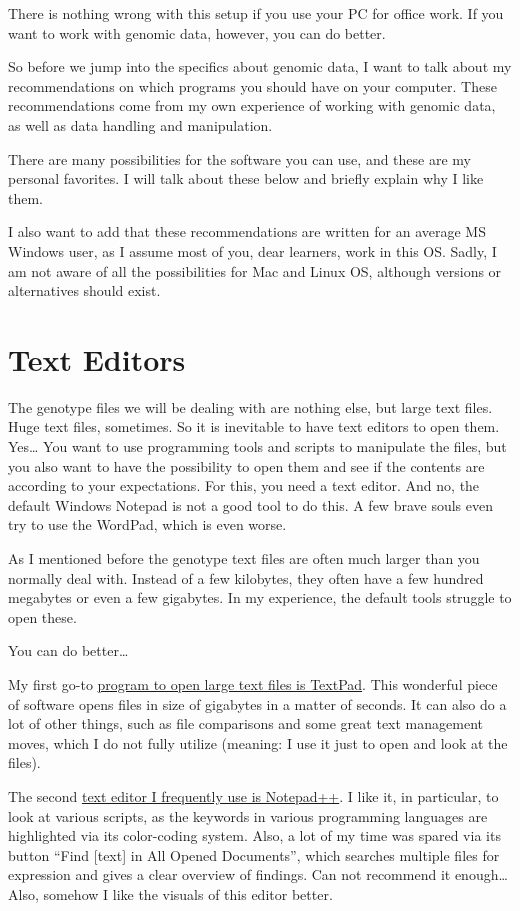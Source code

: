 \documentclass[]{book}
\begin{document}
There is nothing wrong with this setup if you use your PC for office
work. If you want to work with genomic data, however, you can do better.

So before we jump into the specifics about genomic data, I want to talk
about my recommendations on which programs you should have on your
computer. These recommendations come from my own experience of working
with genomic data, as well as data handling and manipulation.

There are many possibilities for the software you can use, and these are
my personal favorites. I will talk about these below and briefly explain
why I like them.

I also want to add that these recommendations are written for an average
MS Windows user, as I assume most of you, dear learners, work in this
OS. Sadly, I am not aware of all the possibilities for Mac and Linux OS,
although versions or alternatives should exist.

\section{Text Editors}\label{text-editors}

The genotype files we will be dealing with are nothing else, but large
text files. Huge text files, sometimes. So it is inevitable to have text
editors to open them. Yes\ldots{} You want to use programming tools and
scripts to manipulate the files, but you also want to have the
possibility to open them and see if the contents are according to your
expectations. For this, you need a text editor. And no, the default
Windows Notepad is not a good tool to do this. A few brave souls even
try to use the WordPad, which is even worse.

As I mentioned before the genotype text files are often much larger than
you normally deal with. Instead of a few kilobytes, they often have a
few hundred megabytes or even a few gigabytes. In my experience, the
default tools struggle to open these.

You can do better\ldots{}

My first go-to \href{https://www.textpad.com/home}{program to open large
text files is TextPad}. This wonderful piece of software opens files in
size of gigabytes in a matter of seconds. It can also do a lot of other
things, such as file comparisons and some great text management moves,
which I do not fully utilize (meaning: I use it just to open and look at
the files).

The second \href{https://notepad-plus-plus.org/}{text editor I
frequently use is Notepad++}. I like it, in particular, to look at
various scripts, as the keywords in various programming languages are
highlighted via its color-coding system. Also, a lot of my time was
spared via its button ``Find {[}text{]} in All Opened Documents'', which
searches multiple files for expression and gives a clear overview of
findings. Can not recommend it enough\ldots{} Also, somehow I like the
visuals of this editor better.
\end{document}
